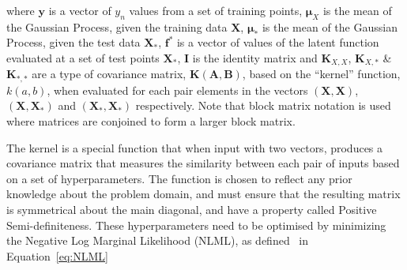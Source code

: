 \documentclass[12pt]{article}
\begin{document}


    \noindent where $\mathbf{y}$ is a vector of $y_n$ values from a set of training points, $\boldsymbol{\mu}_X$ is the mean of the Gaussian Process, given the training data $\mathbf{X}$, $\boldsymbol{\mu}_*$ is the mean of the Gaussian Process, given the test data $\mathbf{X}_*$, $\mathbf{f}^*$ is a vector of values of the latent function evaluated at a set of test points $\mathbf{X}_*$, $\mathbf{I}$ is the identity matrix and $\mathbf{K}_{X,X}$, $\mathbf{K}_{X,*}$ \& $\mathbf{K}_{*,*}$ are a type of covariance matrix, $\mathbf{K}(\mathbf{A},\mathbf{B})$, based on the ``kernel'' function, $k(a,b)$, when evaluated for each pair elements in the vectors $(\mathbf{X},\mathbf{X})$, $(\mathbf{X},\mathbf{X}_*)$ and $(\mathbf{X}_*,\mathbf{X}_*)$ respectively.
    Note that block matrix notation is used where matrices are conjoined to form a larger block matrix. 

    The kernel is a special function that when input with two vectors, produces a covariance matrix that measures the similarity between each pair of inputs based on a set of hyperparameters.
    The function is chosen to reflect any prior knowledge about the problem domain, and must ensure that the resulting matrix is symmetrical about the main diagonal, and have a property called Positive Semi-definiteness.
    These hyperparameters need to be optimised by minimizing the Negative Log Marginal Likelihood (NLML), as defined~\cite{murphy2023probabilistic} in Equation~\ref{eq:NLML}
\end{document}
